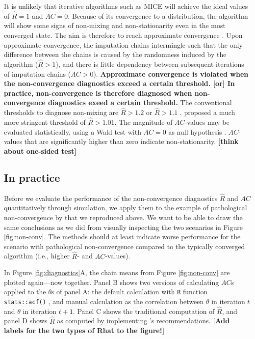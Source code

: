\documentclass[Royal,times,sageh]{sagej}
\begin{document}
It is unlikely that iterative algorithms such as MICE will achieve the ideal values of \(\widehat{R}=1\) and \(AC=0\). Because of its convergence to a distribution, the algorithm will show some signs of non-mixing and non-stationarity even in the most converged state. The aim is therefore to reach approximate convergence \citep{gelm13}. Upon approximate convergence, the imputation chains intermingle such that the only difference between the chains is caused by the randomness induced by the algorithm (\(\widehat{R} > 1\)), and there is little dependency between subsequent iterations of imputation chains (\(AC > 0\)). \textbf{Approximate convergence is violated when the non-convergence diagnostics exceed a certain threshold. {[}or{]} In practice, non-convergence is therefore diagnosed when non-convergence diagnostics exeed a certain threshold.} The conventional thresholds to diagnose non-mixing are \(\widehat{R} > 1.2\) \citep{gelm92} or \(\widehat{R} > 1.1\) \citep{gelm13}. \citet{veht19} proposed a much more stringent threshold of \(\widehat{R} > 1.01\). The magnitude of \(AC\)-values may be evaluated statistically, using a Wald test with \(AC=0\) as null hypothesis \citep{box15}. \(AC\)-values that are significantly higher than zero indicate non-stationarity. \textbf{{[}think about one-sided test{]}}

\hypertarget{in-practice}{%
\subsection{In practice}\label{in-practice}}

Before we evaluate the performance of the non-convergence diagnostics \(\widehat{R}\) and \(AC\) quantitatively through simulation, we apply them to the example of pathological non-convergence by \citet{buur18} that we reproduced above. We want to be able to draw the same conclusions as we did from visually inspecting the two scenarios in Figure \ref{fig:non-conv}. The methods should at least indicate worse performance for the scenario with pathological non-convergence compared to the typically converged algorithm (i.e., higher \(\widehat{R}\)- and \(AC\)-values).

In Figure \ref{fig:diagnostics}A, the chain means from Figure \ref{fig:non-conv} are plotted again---now together. Panel B shows two versions of calculating \(AC\)s applied to the \(\theta\)s of panel A: the default calculation with \texttt{R} function \texttt{stats::acf()} \citep{R}, and manual calculation as the correlation between \(\theta\) in iteration \(t\) and \(\theta\) in iteration \(t+1\). Panel C shows the traditional computation of \(\widehat{R}\), and panel D shows \(\widehat{R}\) as computed by implementing \citet{veht19} 's recommendations. \textbf{{[}Add labels for the two types of Rhat to the figure!{]}}
\end{document}
